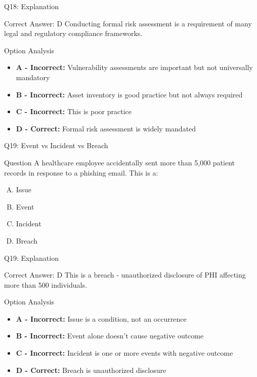 \documentclass{beamer}
\begin{document}
	\begin{frame}{Q18: Explanation}
		\begin{block}{Correct Answer: D}
			Conducting formal risk assessment is a requirement of many legal and regulatory compliance frameworks.
		\end{block}
		\begin{block}{Option Analysis}
			\begin{itemize}
				\item \textbf{A - Incorrect:} Vulnerability assessments are important but not universally mandatory
				\item \textbf{B - Incorrect:} Asset inventory is good practice but not always required
				\item \textbf{C - Incorrect:} This is poor practice
				\item \textbf{D - Correct:} Formal risk assessment is widely mandated
			\end{itemize}
		\end{block}
	\end{frame}
	
	\begin{frame}{Q19: Event vs Incident vs Breach}
		\begin{block}{Question}
			A healthcare employee accidentally sent more than 5,000 patient records in response to a phishing email. This is a:
		\end{block}
		\begin{enumerate}[(A)]
			\item Issue
			\item Event
			\item Incident
			\item Breach
		\end{enumerate}
	\end{frame}
	
	\begin{frame}{Q19: Explanation}
		\begin{block}{Correct Answer: D}
			This is a breach - unauthorized disclosure of PHI affecting more than 500 individuals.
		\end{block}
		\begin{block}{Option Analysis}
			\begin{itemize}
				\item \textbf{A - Incorrect:} Issue is a condition, not an occurrence
				\item \textbf{B - Incorrect:} Event alone doesn't cause negative outcome
				\item \textbf{C - Incorrect:} Incident is one or more events with negative outcome
				\item \textbf{D - Correct:} Breach is unauthorized disclosure
			\end{itemize}
		\end{block}
	\end{frame}
	
\end{document}
